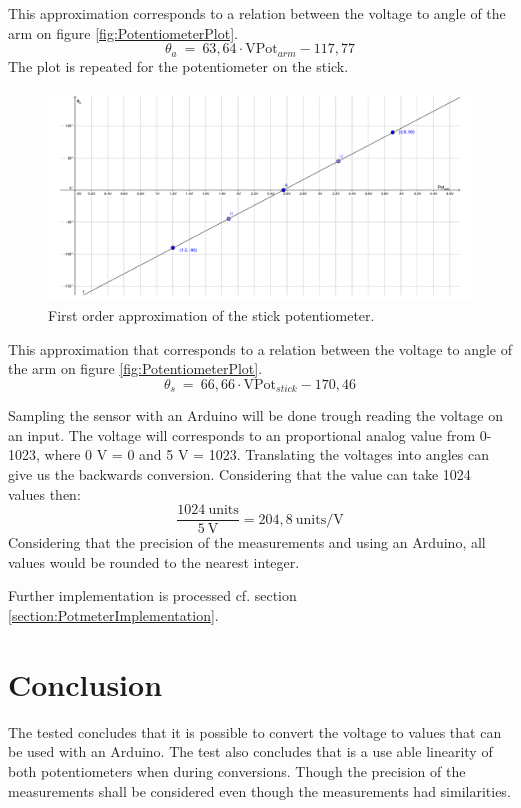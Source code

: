 This approximation corresponds to a relation between the voltage to angle of the arm on figure \ref{fig:PotentiometerPlot}.
\begin{equation}
\theta_a\ =\ 63,64 \cdot \text{VPot}_{arm} - 117,77
\end{equation}
\newpage
The plot is repeated for the potentiometer on the stick.
\begin{figure}[htbp]  
\hspace*{-3cm}
\centering
\includegraphics[width=0.95\paperwidth]{figures/appendix/PotentiometerPlotStick.pdf}
\caption{First order approximation of the stick potentiometer.}
\label{fig:PotentiometerPlotStick}
\end{figure}

This approximation that corresponds to a relation between the voltage to angle of the arm on figure \ref{fig:PotentiometerPlot}.
\begin{equation}
\theta_s\ =\ 66,66 \cdot \text{VPot}_{stick} - 170,46
\end{equation}

Sampling the sensor with an Arduino will be done trough reading the voltage on an input. The voltage will corresponds to an proportional analog value from 0-1023, where 0 V = 0 and 5 V = 1023. Translating the voltages into angles can give us the backwards conversion. Considering that the value can take 1024 values then:
\begin{equation}
\dfrac{1024\ \text{units}}{5\ \text{V}} = 204,8\ \text{units/V}
\end{equation}     
Considering that the precision of the measurements and using an Arduino, all values would be rounded to the nearest integer.

Further implementation is processed cf. section \ref{section:PotmeterImplementation}.

\section*{Conclusion}
The tested concludes that it is possible to convert the voltage to values that can be used with an Arduino. The test also concludes that is a use able linearity of both potentiometers when during conversions. Though the precision of the measurements shall be considered even though the measurements had similarities. 


